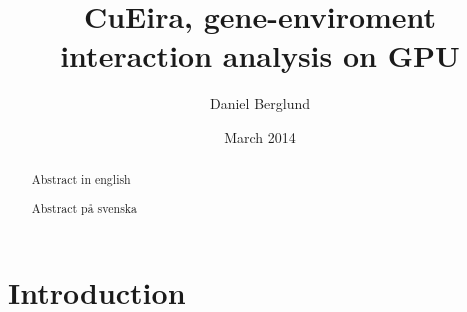 \documentclass[10pt,a4paper]{article}
\title{CuEira, gene-enviroment interaction analysis on GPU}
\author{Daniel Berglund}
\date{March 2014}
\makeatletter
\newcommand\ackname{Acknowledgements}
\newenvironment{acknowledgements}{
      \titlepage
      \null\vfil
      \@beginparpenalty\@lowpenalty
      \begin{center}%
        \bfseries \ackname
        \@endparpenalty\@M
      \end{center}}%
     {\par\vfil\null\endtitlepage}
\newenvironment{acknowledgements}{
      \if@twocolumn
        \section*{\abstractname}
      \else
        \small
        \begin{center}
          {\bfseries \ackname\vspace{-.5em}\vspace{\z@}}
        \end{center}
        \quotation
      \fi}
      {\if@twocolumn\else\endquotation\fi}
\makeatother
\begin{document}
\maketitle
\thispagestyle{empty}

\clearpage
\thispagestyle{empty}
\begin{abstract}
Abstract in english
\end{abstract}

\clearpage
\thispagestyle{empty}
\begin{abstract}
Abstract på svenska
\end{abstract}

\clearpage
\thispagestyle{empty}

\thispagestyle{empty}
\tableofcontents

\newpage
\setcounter{page}{1}
\section{Introduction}


\end{document}
